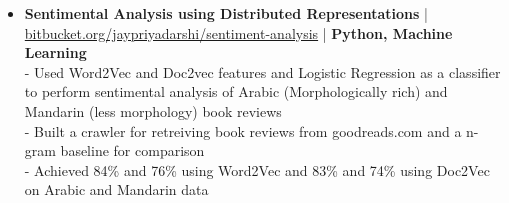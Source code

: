 \begin{itemize}
  \item \textbf{Sentimental Analysis using Distributed Representations} | \href{https://bitbucket.org/jaypriyadarshi/sentiment-analysis}{bitbucket.org/jaypriyadarshi/sentiment-analysis} | \textbf{Python, Machine Learning}\\
 - Used Word2Vec and Doc2vec features and Logistic Regression as a classifier to perform sentimental analysis of Arabic (Morphologically rich) and Mandarin (less morphology) book reviews\\
 - Built a crawler for retreiving book reviews from goodreads.com and a n-gram baseline for comparison\\
 - Achieved 84\% and 76\% using Word2Vec and 83\% and 74\% using Doc2Vec on Arabic and Mandarin data


\end{itemize}
\vspace{5pt}

